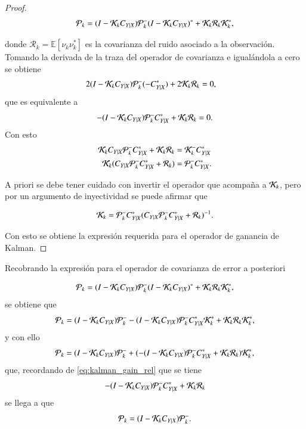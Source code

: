 \begin{proof}
\begin{equation*}
\mathcal{P}_k = (I - \mathcal{K}_k C_{Y|X})\mathcal{P}^-_{k}(I - \mathcal{K}_k C_{Y|X})^* + \mathcal{K}_k \mathcal{R}_k \mathcal{K}_k^*,
\end{equation*}

donde $\mathcal{R}_k = \mathbb{E}[\nu_k\nu_k^*]$ es la covarianza del ruido asociado a la observación. Tomando la derivada de la traza del operador de covarianza e igualándola a cero se obtiene
\begin{align*}
2(I - \mathcal{K}_k C_{Y|X})\mathcal{P}^-_{k}(-C_{Y|X}^*) + 2\mathcal{K}_k \mathcal{R}_k &= 0,
\end{align*}
que es equivalente a 
\begin{equation}
    -(I - \mathcal{K}_k C_{Y|X})\mathcal{P}^-_{k}C_{Y|X}^* + \mathcal{K}_k \mathcal{R}_k = 0.
    \label{eq:kalman_gain_rel}
\end{equation}
Con esto
\begin{align*}
\mathcal{K}_k C_{Y|X}\mathcal{P}^-_{k}C_{Y|X}^* + \mathcal{K}_k \mathcal{R}_k &= \mathcal{K}^-_{k}C_{Y|X}^* \\
\mathcal{K}_k(C_{Y|X}\mathcal{P}^-_{k}C_{Y|X}^* + \mathcal{R}_k) &= \mathcal{P}^-_{k}C_{Y|X}^* .
\end{align*}

A priori se debe tener cuidado con invertir el operador que acompaña a $\mathcal{K}_k$, pero por un argumento de inyectividad se puede afirmar que

\begin{equation*} 
\mathcal{K}_k = \mathcal{P}^-_{k}C_{Y|X}^*(C_{Y|X}\mathcal{P}^-_{k}C_{Y|X}^* + \mathcal{R}_k)^{-1}.
\end{equation*}

Con esto se obtiene la expresión requerida para el operador de ganancia de Kalman.
\end{proof}

Recobrando la expresión para el operador de covarianza de error a posteriori

\begin{equation*}
\mathcal{P}_k = (I - \mathcal{K}_k C_{Y|X})\mathcal{P}^-_{k}(I - \mathcal{K}_k C_{Y|X})^* + \mathcal{K}_k \mathcal{R}_k \mathcal{K}_k^*,
\end{equation*}
se obtiene que
\begin{equation*}
\mathcal{P}_k = (I - \mathcal{K}_k C_{Y|X})\mathcal{P}^-_{k} - (I - \mathcal{K}_k C_{Y|X})\mathcal{P}^-_{k} C_{Y|X}^* \mathcal{K}_k^* + \mathcal{K}_k \mathcal{R}_k \mathcal{K}_k^*,
\end{equation*}
y con ello
\begin{equation*}
\mathcal{P}_k = (I - \mathcal{K}_k C_{Y|X})\mathcal{P}^-_{k} + (-(I - \mathcal{K}_k C_{Y|X})\mathcal{P}^-_{k} C_{Y|X}^*  + \mathcal{K}_k \mathcal{R}_k) \mathcal{K}_k^*,
\end{equation*}
que, recordando de \eqref{eq:kalman_gain_rel} que se tiene
\begin{equation*}
    -(I - \mathcal{K}_k C_{Y|X})\mathcal{P}^-_{k} C_{Y|X}^*  + \mathcal{K}_k \mathcal{R}_k
\end{equation*}
se llega a que
\begin{equation*}
    \mathcal{P}_k = (I - \mathcal{K}_k C_{Y|X})\mathcal{P}^-_{k}.
\end{equation*}

